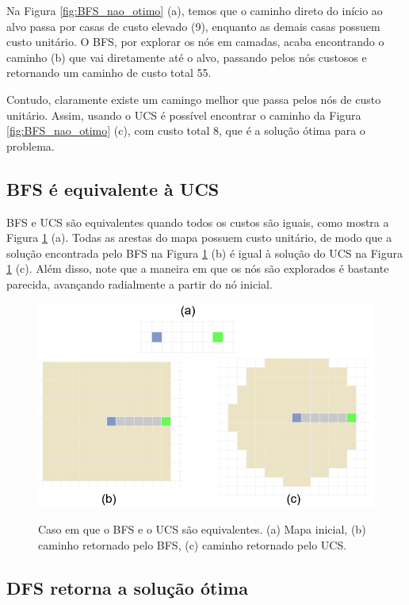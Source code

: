 \documentclass[letterpaper]{article} %
\begin{document}
Na Figura \ref{fig:BFS_nao_otimo} (a), temos que o caminho direto do início ao alvo 
passa por casas de custo elevado (9), enquanto as demais casas possuem custo unitário.
O BFS, por explorar os nós em camadas, acaba encontrando o caminho (b) que vai diretamente 
até o alvo, passando pelos nós custosos e retornando um caminho de custo total 55.

Contudo, claramente existe um camingo melhor que passa pelos nós de custo unitário.
Assim, usando o UCS é possível encontrar o caminho da Figura \ref{fig:BFS_nao_otimo} (c), 
com custo total 8, que é a solução ótima para o problema.

\subsection{BFS é equivalente à UCS}

BFS e UCS são equivalentes quando todos os custos são iguais, como mostra 
a Figura \ref{fig:BFS_UCS_equiv} (a). Todas as arestas do mapa possuem
 custo unitário, de modo que a solução encontrada pelo BFS na Figura \ref{fig:BFS_UCS_equiv} (b) 
 é igual à solução do UCS na Figura \ref{fig:BFS_UCS_equiv} (c). Além disso, note que 
 a maneira em que os nós são explorados é bastante parecida, avançando radialmente 
 a partir do nó inicial.


\begin{figure}[htb]
	\centering 
    \caption{Caso em que o BFS e o UCS são equivalentes. (a) Mapa inicial, (b)
	caminho retornado pelo BFS, (c) caminho retornado pelo UCS.}
	\includegraphics[width=\columnwidth]{images/BFS_UCS_equiv.png}
	\label{fig:BFS_UCS_equiv}
\end{figure}


\subsection{DFS retorna a solução ótima}
\end{document}

